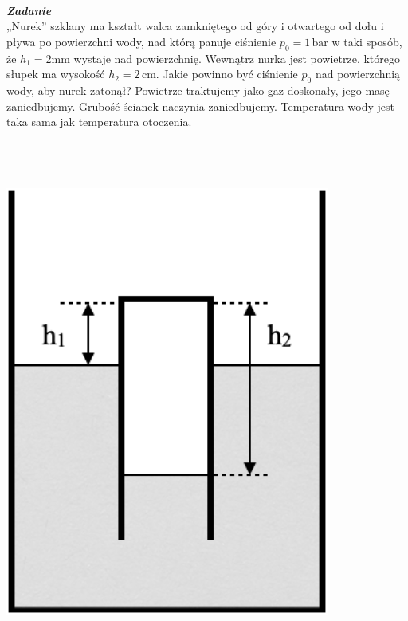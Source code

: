 \documentclass[11pt,a4paper]{article}
\newcounter{zadanie}\newcommand{\zadanie}[1][]{\addtocounter{zadanie}{1} ~\\  {\bf \emph{Zadanie \arabic{zadanie} #1 }} \\}
\begin{document}
\clearpage

\begin{minipage}{0.75\textwidth}
\zadanie
„Nurek” szklany ma kształt walca zamkniętego od góry i otwartego od dołu i pływa po powierzchni wody, nad którą panuje ciśnienie $p_0 = 1\,\textrm{bar}$ w taki sposób, że $h_1 = 2\textrm{mm}$ wystaje nad powierzchnię. Wewnątrz nurka jest powietrze, którego słupek ma wysokość $h_2 = 2\,\textrm{cm}$.
Jakie powinno być ciśnienie $p_0$ nad powierzchnią wody, aby nurek zatonął? Powietrze traktujemy jako gaz doskonały, jego masę zaniedbujemy. Grubość ścianek naczynia zaniedbujemy. Temperatura wody jest taka sama jak temperatura otoczenia.\\\\\\\\

\end{minipage}
\begin{minipage}{0.25\textwidth}
\begin{center}

\includegraphics[width=0.8\textwidth]{zadanie8.png}
\end{center}
\end{minipage}
\end{document}
